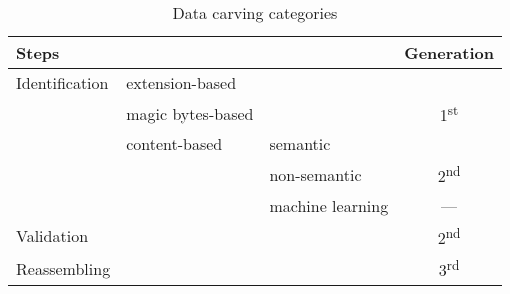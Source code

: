 \begin{table*}[!ht]
    \centering
    \caption{Data carving categories}
    \label{tab:categories}
    \begin{tabular}{ l | l | l | c }
      \multicolumn{3}{l|}{Steps}                                 & Generation\\
      \hline\hline
      Identification    & extension-based   &                   &   \\
                        \cline{2-3}
                        & magic bytes-based &                   & \multirow{-2}{*}{1\textsuperscript{st}}\\
                        \cline{2-4}
                        & content-based     & semantic          &   \\
                                            \cline{3-3}
                        &                   & non-semantic      & \multirow{-2}{*}{2\textsuperscript{nd}}\\
                                            \cline{3-4}
                        &                   & machine learning  &  --- \\
      \hline
      Validation        &                   &                   & 2\textsuperscript{nd} \\
      \hline
      Reassembling      &                   &                   & 3\textsuperscript{rd}\\
      \hline
    \end{tabular}
\end{table*}

